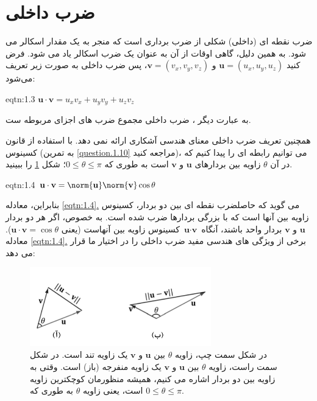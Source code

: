 \section{\textbf{ضرب داخلی}}
\label{sec:1.3}
{
    \Large
    \begin{spacing}{1.5}
        ضرب نقطه ای (داخلی) شکلی از ضرب برداری است که منجر به یک مقدار اسکالر می شود.
        به همین دلیل، گاهی اوقات از آن به عنوان یک ضرب اسکالر یاد می شود.
        فرض کنید $\textbf{u}=(u_{x},u_{y},u_{z})$ و  $\textbf{v}=(v_{x},v_{y},v_{z})$،
        پس ضرب داخلی به صورت زیر تعریف می‌شود:

        \begin{eqtn}{eqtn:1.3}
            \centering
            \LARGE
            $\textbf{u}\cdot\textbf{v}=u_{x}v_{x}+u_{y}v_{y}+u_{z}v_{z}$
        \end{eqtn}

        به عبارت دیگر ، ضرب داخلی مجموع ضرب های اجزای مربوطه ست.

        همچنین تعریف ضرب داخلی معنای هندسی آشکاری ارائه نمی دهد.
        با استفاده از قانون کسینوس (به تمرین \ref{question.1.10} مراجعه کنید)، می توانیم رابطه ای را پیدا کنیم که در آن $\theta$ زاویه بین بردارهای $\textbf{u}$ و $\textbf{v}$ است به طوری که $0\leq\theta\leq\pi$؛ شکل \ref{fig:4.Session.1.1.9} را ببینید.

        \begin{eqtn}{eqtn:1.4}
            \centering
            \LARGE
            $\textbf{u}\cdot\textbf{v}=\norm{\textbf{u}}\norm{\textbf{v}}\cos\theta$
        \end{eqtn}

        بنابراین، معادله \hyperref[eqtn:1.4]{\ref{eqtn:1.4}.} می گوید که حاصلضرب نقطه ای بین دو بردار، کسینوس زاویه بین آنها است که با بزرگی بردارها ضرب شده است.
        به خصوص، اگر هر دو بردار $\textbf{u}$ و $\textbf{v}$ بردار واحد باشند،
        آنگاه $\textbf{u}\cdot\textbf{v}$ کسینوس زاویه بین آنهاست (یعنی $\textbf{u}\cdot\textbf{v}=\cos\theta$).
        معادله \hyperref[eqtn:1.4]{\ref{eqtn:1.4}.} برخی از ویژگی های هندسی مفید ضرب داخلی را در اختیار ما قرار می دهد:

        \begin{figure}[H]
            \centering
            \setlength{\belowcaptionskip}{-10pt}
            \includegraphics[width=0.7\textwidth]{Images/4/1/4.Session.1.1.9}
            \caption{در شکل سمت چپ، زاویه $\theta$ بین $\textbf{u}$ و $\textbf{v}$ یک زاویه تند است.
            در شکل سمت راست، زاویه $\theta$ بین $\textbf{u}$ و $\textbf{v}$ یک زاویه منفرجه (باز) است.
            وقتی به زاویه بین دو بردار اشاره می کنیم، همیشه منظورمان کوچکترین زاویه است،
            یعنی زاویه $\theta$ به طوری که $0\leq\theta\leq\pi$.}
            \label{fig:4.Session.1.1.9}
        \end{figure}


\end{spacing}}
